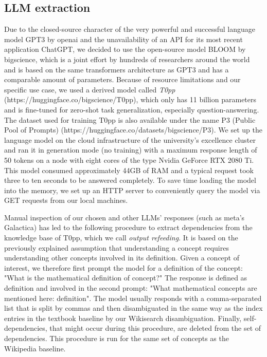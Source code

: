 \documentclass{article}
\begin{document}
\subsection{LLM extraction}
Due to the closed-source character of the very powerful and successful language model GPT3 by openai and the unavailability of an API for its most recent application ChatGPT, we decided to use the open-source model BLOOM by bigscience, which is a joint effort by hundreds of researchers around the world and is based on the same transformers architecture as GPT3 and has a comparable amount of parameters. Because of resource limitations and our specific use case, we used a derived model called \textit{T0pp} (https://huggingface.co/bigscience/T0pp), which only has 11 billion parameters and is fine-tuned for zero-shot task generalization, especially question-answering. The dataset used for training T0pp is also available under the name P3 (Public Pool of Prompts) (https://huggingface.co/datasets/bigscience/P3). We set up the language model on the cloud infrastructure of the university's excellence cluster and ran it in generation mode (no training) with a maximum response length of 50 tokens on a node with eight cores of the type Nvidia GeForce RTX 2080 Ti. This model consumed approximately 44GB of RAM and a typical request took three to ten seconds to be answered completely. To save time loading the model into the memory, we set up an HTTP server to conveniently query the model via GET requests from our local machines.

Manual inspection of our chosen and other LLMs' responses (such as meta's Galactica) has led to the following procedure to extract dependencies from the knowledge base of T0pp, which we call \textit{output refeeding}. It is based on the previously explained assumption that understanding a concept requires understanding other concepts involved in its definition. Given a concept of interest, we therefore first prompt the model for a definition of the concept: "What is the mathematical definition of {concept}?" The response is defined as {definition} and involved in the second prompt: "What mathematical concepts are mentioned here: {definition}". The model usually responds with a comma-separated list that is split by commas and then disambiguated in the same way as the index entries in the textbook baseline by our Wikisearch disambiguation. Finally, self-dependencies, that might occur during this procedure, are deleted from the set of dependencies. This procedure is run for the same set of concepts as the Wikipedia baseline.
\end{document}
